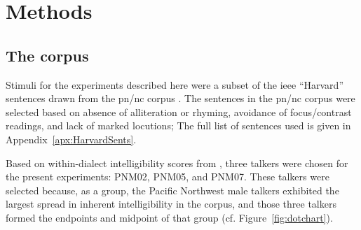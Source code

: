 \chapter{Methods}

\section{The corpus}
Stimuli for the experiments described here were a subset of the \ac{ieee} “Harvard” sentences \citep{HarvardSents} drawn from the \ac{pn/nc} corpus \citep{xxx}.  The sentences in the \ac{pn/nc} corpus were selected based on absence of alliteration or rhyming, avoidance of focus/contrast readings, and lack of marked locutions; The full list of sentences used is given in Appendix~\ref{apx:HarvardSents}.  

Based on within-dialect intelligibility scores from \citet{McCloyEtAl2013}, three talkers were chosen for the present experiments: PNM02, PNM05, and PNM07.  These talkers were selected because, as a group, the Pacific Northwest male talkers exhibited the largest spread in inherent intelligibility in the corpus, and those three talkers formed the endpoints and midpoint of that group (cf. Figure~\ref{fig:dotchart}).

